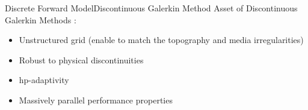 \begin{frame}{Discrete Forward Model}{Discontinuous Galerkin Method}
  Asset of Discontinuous Galerkin Methods : \\

  \begin{itemize}
  \item Unstructured grid (enable to match the topography and media irregularities)
  \item Robust to physical discontinuities
  \item hp-adaptivity
  \item Massively parallel performance properties
  \end{itemize}

  \begin{figure}[H]
    \subfigure[h-adaptivity]{
      
}
    \hspace{1cm}
\end{figure}
\end{frame}

